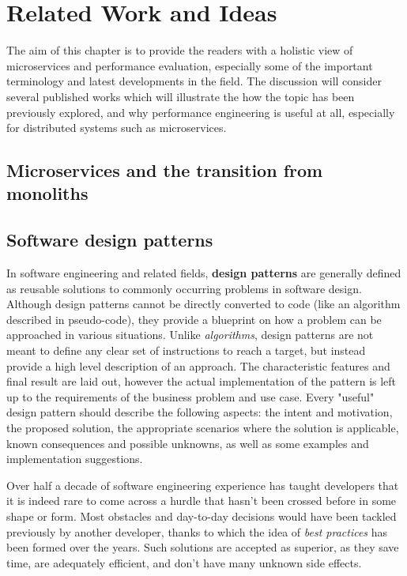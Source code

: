 \chapter{Related Work and Ideas}

The aim of this chapter is to provide the readers with a holistic view of microservices and performance evaluation, especially some of the important terminology and latest developments in the field. The discussion will consider several published works which will illustrate the how the topic has been previously explored, and why performance engineering is useful at all, especially for distributed systems such as microservices.

\section{Microservices and the transition from monoliths}

\section{Software design patterns}

In software engineering and related fields, \textbf{design patterns} are generally defined as reusable solutions to commonly occurring problems in software design. Although design patterns cannot be directly converted to code (like an algorithm described in pseudo-code), they provide a blueprint on how a problem can be approached in various situations. Unlike \textit{algorithms}, design patterns are not meant to define any clear set of instructions to reach a target, but instead provide a high level description of an approach. The characteristic features and final result are laid out, however the actual implementation of the pattern is left up to the requirements of the business problem and use case. Every "useful" design pattern should describe the following aspects: the intent and motivation, the proposed solution, the appropriate scenarios where the solution is applicable, known consequences and possible unknowns, as well as some examples and implementation suggestions.

Over half a decade of software engineering experience has taught developers that it is indeed rare to come across a hurdle that hasn't been crossed before in some shape or form. Most obstacles and day-to-day decisions would have been tackled previously by another developer, thanks to which the idea of \textit{best practices} has been formed over the years. Such solutions are accepted as superior, as they save time, are adequately efficient, and don't have many unknown side effects.

